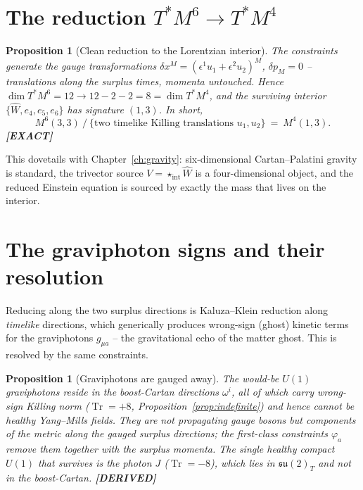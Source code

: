 \documentclass[11pt,oneside]{book}
\newcommand{\Wh}{\hat{W}}                         %
\newcommand{\Tr}{\operatorname{Tr}}
\newcommand{\su}{\mathfrak{su}}
\newcommand{\status}[1]{{\sffamily\bfseries\color{statuscol}[#1]}}
\theoremstyle{plain}
\newtheorem{proposition}[theorem]{Proposition}
\theoremstyle{definition}
\theoremstyle{remark}
\begin{document}
\section{The reduction $T^*M^6\to T^*M^4$}
\label{sec:reduction}

\begin{proposition}[Clean reduction to the Lorentzian interior]
\label{prop:reduction}
The constraints generate the gauge transformations
$\delta x^M=(\epsilon^1u_1+\epsilon^2u_2)^M$, $\delta p_M=0$ -- translations along
the surplus times, momenta untouched. Hence
$\dim T^*M^6=12\to 12-2-2=8=\dim T^*M^4$, and the surviving interior
$\{\Wh,e_4,e_5,e_6\}$ has signature $(1,3)$. In short,
\[
  M^6(3,3)\ \big/\ \{\text{two timelike Killing translations }u_1,u_2\}\ =\ M^4(1,3).
\]
\status{EXACT}
\end{proposition}

This dovetails with Chapter~\ref{ch:gravity}: six-dimensional Cartan--Palatini
gravity is standard, the trivector source $V=\star_{\mathrm{int}}\Wh$ is a
four-dimensional object, and the reduced Einstein equation is sourced by exactly the
mass that lives on the interior.

\section{The graviphoton signs and their resolution}
\label{sec:graviphotons}

Reducing along the two surplus directions is Kaluza--Klein reduction along
\emph{timelike} directions, which generically produces wrong-sign (ghost) kinetic
terms for the graviphotons $g_{\mu a}$ \cite{Hull1998} -- the gravitational echo of
the matter ghost. This is resolved by the same constraints.

\begin{proposition}[Graviphotons are gauged away]
\label{prop:graviphotons}
The would-be $U(1)$ graviphotons reside in the boost-Cartan directions
$\omega^i$, all of which carry wrong-sign Killing norm ($\Tr=+8$,
Proposition~\ref{prop:indefinite}) and hence cannot be healthy Yang--Mills fields.
They are not propagating gauge bosons but components of the metric along the gauged
surplus directions; the first-class constraints $\varphi_a$ remove them together
with the surplus momenta. The single healthy compact $U(1)$ that survives is the
photon $J$ ($\Tr=-8$), which lies in $\su(2)_T$ and not in the boost-Cartan.
\status{DERIVED}
\end{proposition}
\end{document}
